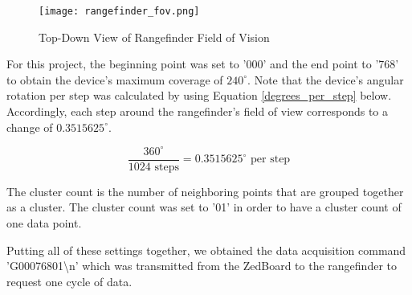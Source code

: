 \begin{figure}[H]
	\centerline{\texttt{[image: rangefinder\_fov.png]}}
	\caption{Top-Down View of Rangefinder Field of Vision \cite{urg04lx_datasheet}}
	\label{rangefinder_fov}
\end{figure}

For this project, the beginning point was set to '000' and the end point to '768' to obtain the device's maximum coverage of $240^\circ$. Note that the device's angular rotation per step was calculated by using Equation \ref{degrees_per_step} below. Accordingly, each step around the rangefinder's field of view corresponds to a change of $0.3515625^\circ$.

\begin{equation}
	\dfrac{360^\circ }{1024 \textrm{ steps}}  = 0.3515625^\circ \textrm{ per step}
	\label{degrees_per_step}
\end{equation}

\par
The cluster count is the number of neighboring points that are grouped together as a cluster. The cluster count was set to '01' in order to have a cluster count of one data point.
\par
Putting all of these settings together, we obtained the data acquisition command 'G00076801\textbackslash{}n' which was transmitted from the ZedBoard to the rangefinder to request one cycle of data.





